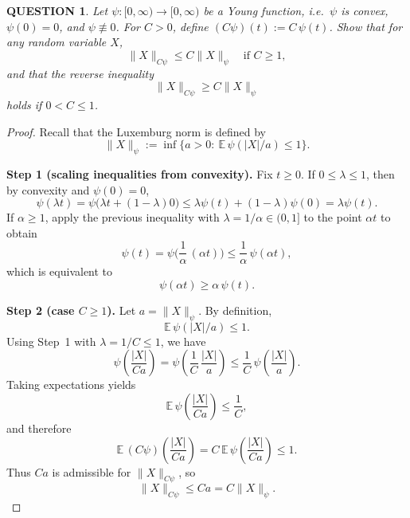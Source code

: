 \documentclass[12pt]{article}
\renewcommand{\(}{\left(}%
\renewcommand{\)}{\right)}%
\renewcommand{\[}{\left[}%
\renewcommand{\]}{\right]}%
\newtheorem{question}{QUESTION}[section]}
\newtheorem{proof}{Proof.}}
\begin{document}
\begin{question}
Let $\psi:[0,\infty)\to[0,\infty)$ be a Young function, i.e.\ $\psi$ is convex,
$\psi(0)=0$, and $\psi\not\equiv 0$. For $C>0$, define $(C\psi)(t):=C\,\psi(t)$.
Show that for any random variable $X$,
\begin{equation*}
\|X\|_{C\psi}\le C\|X\|_{\psi}\quad\text{if } C\ge 1,
\end{equation*}
and that the reverse inequality
\begin{equation*}
\|X\|_{C\psi}\ge C\|X\|_{\psi}
\end{equation*}
holds if $0<C\le 1$.
\end{question}

\begin{proof}
Recall that the Luxemburg norm is defined by
\begin{equation*}
\|X\|_{\psi}
:=
\inf\Big\{a>0:\ \mathbb E\,\psi(|X|/a)\le 1\Big\}.
\end{equation*}

\textbf{Step 1 (scaling inequalities from convexity).}
Fix $t\ge 0$.
If $0\le \lambda\le 1$, then by convexity and $\psi(0)=0$,
\begin{equation*}
\psi(\lambda t)
=
\psi\big(\lambda t+(1-\lambda)0\big)
\le
\lambda\psi(t)+(1-\lambda)\psi(0)
=
\lambda\psi(t).
\end{equation*}
If $\alpha\ge 1$, apply the previous inequality with $\lambda=1/\alpha\in(0,1]$ to the point $\alpha t$ to obtain
\begin{equation*}
\psi(t)
=
\psi\Big(\frac{1}{\alpha}\,(\alpha t)\Big)
\le
\frac{1}{\alpha}\,\psi(\alpha t),
\end{equation*}
which is equivalent to
\begin{equation*}
\psi(\alpha t)\ge \alpha\,\psi(t).
\end{equation*}

\medskip
\textbf{Step 2 (case $C\ge 1$).}
Let $a=\|X\|_{\psi}$. By definition,
\begin{equation*}
\mathbb E\,\psi(|X|/a)\le 1.
\end{equation*}
Using Step~1 with $\lambda=1/C\le 1$, we have
\begin{equation*}
\psi\!\left(\frac{|X|}{Ca}\right)
=
\psi\!\left(\frac1C\,\frac{|X|}{a}\right)
\le
\frac1C\,\psi\!\left(\frac{|X|}{a}\right).
\end{equation*}
Taking expectations yields
\begin{equation*}
\mathbb E\,\psi\!\left(\frac{|X|}{Ca}\right)\le \frac1C,
\end{equation*}
and therefore
\begin{equation*}
\mathbb E\,(C\psi)\!\left(\frac{|X|}{Ca}\right)
=
C\,\mathbb E\,\psi\!\left(\frac{|X|}{Ca}\right)
\le 1.
\end{equation*}
Thus $Ca$ is admissible for $\|X\|_{C\psi}$, so
\begin{equation*}
\|X\|_{C\psi}\le Ca = C\|X\|_{\psi}.
\end{equation*}


\end{proof}
\end{document}
